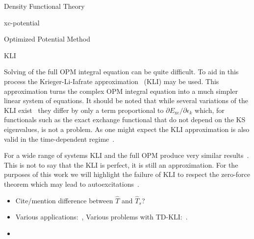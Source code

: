 \documentclass[letterpaper, 11 pt]{report}
\begin{document}
\begin{chapter}{Density Functional Theory \label{chap:dft}}
\begin{section}{xc-potential \label{sec:xcpot}}
\begin{subsection}{Optimized Potential Method \label{sec:opm}}
      \end{subsection}

      \begin{subsection}{KLI \label{sec:kli}}

         Solving of the full OPM integral equation can be quite difficult. To aid in this process
         the Krieger-Li-Iafrate approximation~\cite{kli1} (KLI) may be used. This approximation turns
         the complex OPM integral equation into a much simpler linear system of equations. It should
         be noted that while several variations of the KLI exist~\cite{kli1, kli2, kli3} they differ
         by only a term proportional to $\partial E_\mathrm{xc} / \partial \epsilon_k$ which, for
         functionals such as the exact exchange functional that do not depend on the KS eigenvalues,
         is not a problem. As one might expect the KLI approximation is also valid in the time-dependent
         regime~\cite{tdkli1, tdkli2, tdkli3}.
         
         For a wide range of systems KLI and the full OPM produce very similar results~\cite{opm-rev}.
         This is not to say that the KLI is perfect, it is still an approximation. For the purposes of 
         this work we will highlight the failure of KLI to respect the zero-force theorem which may lead
         to autoexcitations~\cite{kli-zero-force}.

      \end{subsection}

   \end{section}

   \begin{itemize}

      \item Cite/mention difference between $\hat{T}$ and $\hat{T}_s$?

      \item Various applications:~\cite[p. 254]{dft-engel},
         Various problems with TD-KLI:~\cite[p. 135-136]{tddft}.

      \item {\color{red}{?`Should I add more detail?}} %

   \end{itemize}

\end{chapter}
\end{document}
